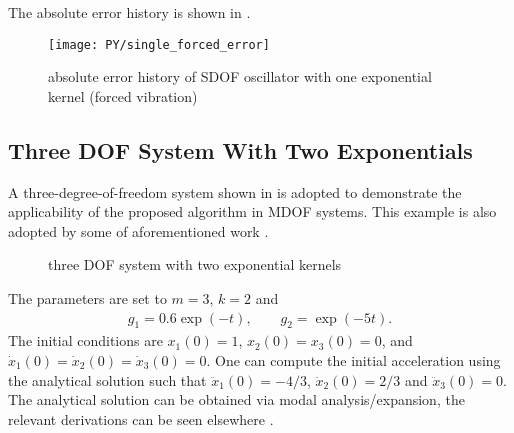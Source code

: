 The absolute error history is shown in .
\begin{figure}[H]
\centering
\texttt{[image: PY/single\_forced\_error]}
\caption{absolute error history of SDOF oscillator with one exponential kernel (forced vibration)}\label{fig:sdof_forced_error}
\end{figure}
\subsection{Three DOF System With Two Exponentials}
A three-degree-of-freedom system shown in  is adopted to demonstrate the applicability of the proposed algorithm in MDOF systems. This example is also adopted by some of aforementioned work \cite[see, e.g.,][]{Adhikari2004,Cortes2009,Shen2019,Liu2023}.
\begin{figure}[H]
\centering
{}
\caption{three DOF system with two exponential kernels}\label{fig:three_dof}
\end{figure}
The parameters are set to $m=3$, $k=2$ and
\begin{gather}
g_1=\num{0.6}\exp\left(-t\right),\qquad
g_2=\exp\left(-5t\right).
\end{gather}
The initial conditions are $x_1\left(0\right)=1$, $x_2\left(0\right)=x_3\left(0\right)=0$, and $\dot{x}_1\left(0\right)=\dot{x}_2\left(0\right)=\dot{x}_3\left(0\right)=0$. One can compute the initial acceleration using the analytical solution such that $\ddot{x}_1\left(0\right)=-4/3$, $\ddot{x}_2\left(0\right)=2/3$ and $\ddot{x}_3\left(0\right)=0$.
The analytical solution can be obtained via modal analysis/expansion, the relevant derivations can be seen elsewhere \citep{Wagner2003}.

